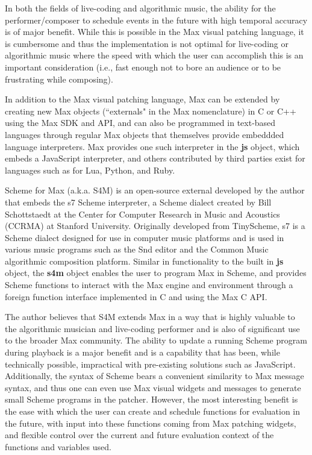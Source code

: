 \documentclass[acmsmall]{acmart}
\begin{document}
In both the fields of live-coding and algorithmic music, the ability for
the performer/composer to schedule events in the future with high temporal
accuracy is of major benefit. While this is possible in the Max visual
patching language, it is cumbersome and thus the implementation is not
optimal for live-coding or algorithmic music where the speed with which
the user can accomplish this is an important consideration (i.e., fast
enough not to bore an audience or to be frustrating while composing).

In addition to the Max visual patching language, Max can be extended
by creating new Max objects (``externals" in the Max nomenclature) in C or C++ 
using the Max SDK and API, and can also be programmed in text-based 
languages through regular Max objects that themselves provide embeddded language
interpreters. Max provides one such interpreter in the \textbf{js} object, 
which embeds a JavaScript interpreter, and others contributed by third parties
exist for languages such as for Lua, Python, and Ruby. 

Scheme for Max (a.k.a. S4M) is an open-source external developed by the 
author that embeds the s7 Scheme interpreter, a Scheme dialect created by
Bill Schottstaedt at the  Center for Computer Research in Music and Acoustics
(CCRMA) at Stanford University. Originally developed
from TinyScheme, s7 is a Scheme dialect designed for use in computer music
platforms and is used in various music programs such as the Snd editor and the
Common Music algorithmic composition platform. 
Similar in functionality to the built
in \textbf{js} object, the \textbf{s4m} object enables the user to program Max in Scheme,
and provides Scheme functions to interact with the Max engine and environment through
a foreign function interface implemented in C and using the Max C API.

The author believes that S4M extends Max in a way that is highly valuable to 
the algorithmic musician and live-coding performer and is also of significant 
use to the broader Max community. The ability to update
a running Scheme program during playback is a major benefit
and is a capability that has been, while technically possible, impractical
with pre-existing solutions such as JavaScript. Additionally, the syntax
of Scheme bears a convenient similarity to Max message syntax, and thus 
one can even use Max visual widgets and messages to generate small Scheme programs in the
patcher. However, the most interesting benefit is the ease with which the user 
can create and schedule functions for evaluation in the future, with 
input into these functions coming from Max patching widgets, and flexible control
over the current and future evaluation context of the functions and variables used.
\end{document}
